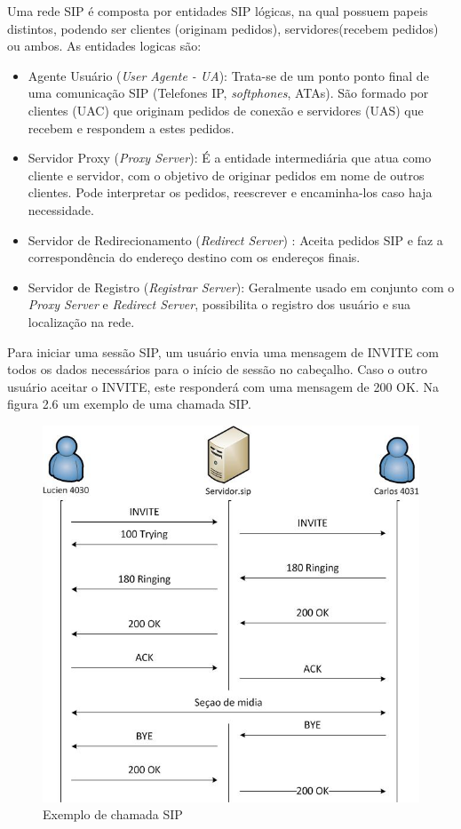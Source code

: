\documentclass[ruledheader]{abnt} %
\begin{document}
Uma rede SIP é composta por entidades SIP lógicas, na qual possuem papeis distintos, podendo ser clientes (originam pedidos), servidores(recebem pedidos) ou ambos. As entidades logicas são: 

\begin{itemize}
  \item Agente Usuário (\textit{User Agente - UA}): Trata-se de um ponto ponto final de uma comunicação SIP (Telefones IP, \textit{softphones}, ATAs). São formado por clientes (UAC) que originam pedidos de conexão e servidores (UAS) que recebem e respondem a estes pedidos. 
  \item Servidor Proxy (\textit{Proxy Server}): É a entidade intermediária que atua como cliente e servidor, com o objetivo de originar pedidos em nome de outros clientes. Pode interpretar os pedidos, reescrever e encaminha-los caso haja necessidade.
  \item Servidor de Redirecionamento (\textit{Redirect Server}) : Aceita pedidos SIP e faz a correspondência do endereço destino com os endereços finais. 
  \item Servidor de Registro (\textit{Registrar Server}): Geralmente usado em conjunto com o \textit{Proxy Server} e \textit{Redirect Server}, possibilita o registro dos usuário e sua localização na rede.
\end{itemize}

Para iniciar uma sessão SIP, um usuário envia uma mensagem de INVITE com todos os dados necessários para o início de sessão no cabeçalho. Caso o outro usuário aceitar o INVITE, este responderá com uma mensagem de 200 OK. Na figura 2.6 um exemplo de uma chamada SIP. 

\begin{figure}[!htdb]
 \centering
  \includegraphics[width = 0.8\linewidth]{images/chamadaSIP}
  \caption{Exemplo de chamada SIP} %
  \label{f_mediaStream}
\end{figure}
\end{document}
